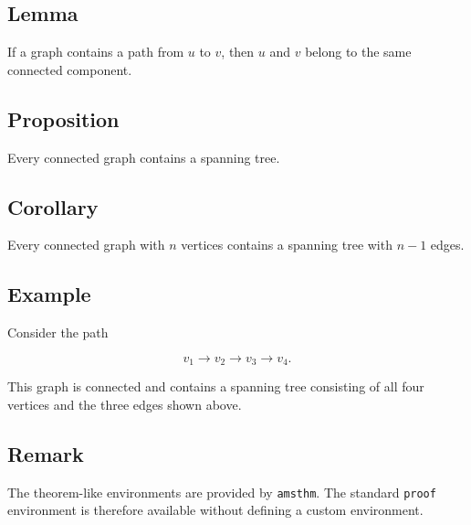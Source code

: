 \documentclass{csdept}
\begin{document}
\subsection{Lemma}

\begin{lemma}
If a graph contains a path from $u$ to $v$, then $u$ and $v$
belong to the same connected component.
\end{lemma}

\subsection{Proposition}

\begin{proposition}
Every connected graph contains a spanning tree.
\end{proposition}

\subsection{Corollary}

\begin{corollary}
Every connected graph with $n$ vertices contains a spanning tree
with $n-1$ edges.
\end{corollary}

\subsection{Example}

\begin{example}
Consider the path

\[
    v_1 \rightarrow v_2 \rightarrow v_3 \rightarrow v_4.
\]

This graph is connected and contains a spanning tree consisting
of all four vertices and the three edges shown above.
\end{example}

\subsection{Remark}

\begin{remark}
The theorem-like environments are provided by \texttt{amsthm}.
The standard \texttt{proof} environment is therefore available
without defining a custom environment.
\end{remark}

\end{document}
